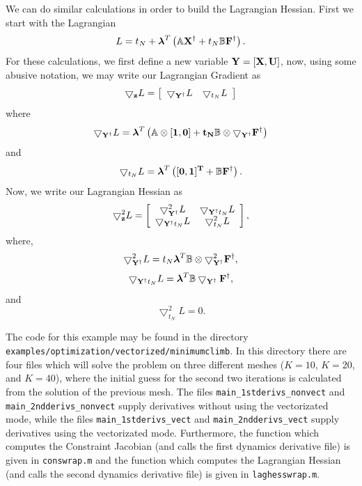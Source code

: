 \documentclass[10pt,pdftex]{article}
\begin{document}
We can do similar calculations in order to build the Lagrangian Hessian. First we start with the Lagrangian
\begin{equation}
L = t_N + \boldsymbol{\lambda}^T\left(\mathbb{A}\mathbf{X}^{\dag} + t_N\mathbb{B}\mathbf{F}^{\dag}\right).
\end{equation}
For these calculations, we first define a new variable $\mathbf{Y} = [\mathbf{X}, \mathbf{U}]$, now, using some abusive notation, we may write our Lagrangian Gradient as
\begin{equation}
\bigtriangledown _{\mathbf{z}} L = 
\left[ \begin{array}{cc}
\bigtriangledown _{\mathbf{Y}^{\dag}} L & \bigtriangledown _{t_N} L
\end{array}\right]
\end{equation}
where
\begin{equation}
\bigtriangledown _{\mathbf{Y}^{\dag}} L = \boldsymbol{\lambda}^T\left(\mathbb{A}\otimes[\bf1, \bf0] + t_N\mathbb{B}\otimes \bigtriangledown _{\mathbf{Y}^{\dag}} \mathbf{F}^{\dag}\right)
\end{equation}
and
\begin{equation}
\bigtriangledown _{t_N} L = \boldsymbol{\lambda} ^T\left([\bf0, 1]^T + \mathbb{B}\mathbf{F}^{\dag}\right).
\end{equation}
Now, we write our Lagrangian Hessian as
\begin{equation}
\bigtriangledown _{\mathbf{z}}^2 L = \left[
\begin{array}{cc}
\bigtriangledown _{\mathbf{Y}^{\dag}}^2 L & \bigtriangledown _{\mathbf{Y}^{\dag}t_N} L \\
\bigtriangledown _{\mathbf{Y}^{\dag}t_N} L & \bigtriangledown _{t_N}^2 L 
\end{array} \right],
\end{equation}
where,
\begin{equation}
\bigtriangledown _{\mathbf{Y}^{\dag}}^2 L  = t_N \boldsymbol{\lambda} ^T  \mathbb{B} \otimes \bigtriangledown _{\mathbf{Y}^{\dag}}^2 \mathbf{F}^{\dag},
\end{equation}
\begin{equation}
\bigtriangledown _{\mathbf{Y}^{\dag}t_N} L = \boldsymbol{\lambda} ^T \mathbb{B}\bigtriangledown_{\mathbf{Y}^{\dag}} \mathbf{F}^{\dag},
\end{equation}
and
\begin{equation}
\bigtriangledown _{t_N}^2 L  = 0.
\end{equation}

The code for this example may be found in the directory \texttt{examples/optimization/vectorized/minimumclimb}. In this directory there are four files which will solve the problem on three different meshes ($K = 10$, $K = 20$, and $K = 40$), where the initial guess for the second two iterations is calculated from the solution of the previous mesh. The files \texttt{main\_1stderivs\_nonvect} and \texttt{main\_2ndderivs\_nonvect} supply derivatives without using the vectorizated mode, while the files \texttt{main\_1stderivs\_vect} and \texttt{main\_2ndderivs\_vect} supply derivatives using the vectorizated mode. Furthermore, the function which computes the Constraint Jacobian (and calls the first dynamics derivative file) is given in \texttt{conswrap.m} and the function which computes the Lagrangian Hessian (and calls the second dynamics derivative file) is given in \texttt{laghesswrap.m}.
\end{document}
